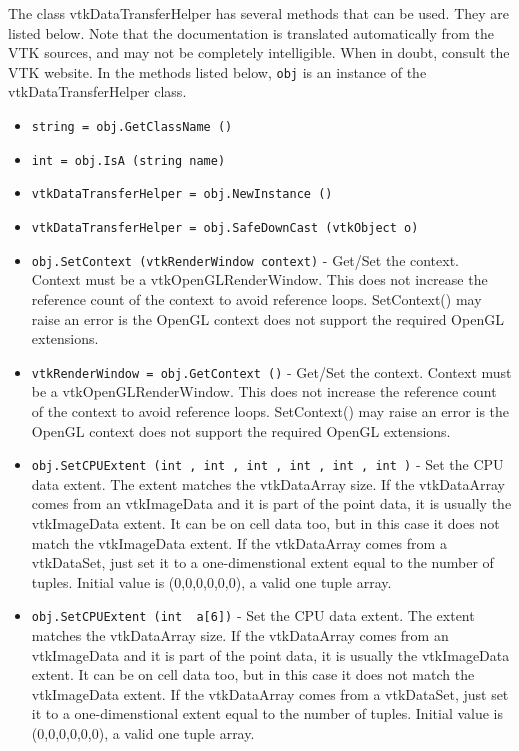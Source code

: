 The class vtkDataTransferHelper has several methods that can be used.
  They are listed below.
Note that the documentation is translated automatically from the VTK sources,
and may not be completely intelligible.  When in doubt, consult the VTK website.
In the methods listed below, \verb|obj| is an instance of the vtkDataTransferHelper class.
\begin{itemize}
\item  \verb|string = obj.GetClassName ()|

\item  \verb|int = obj.IsA (string name)|

\item  \verb|vtkDataTransferHelper = obj.NewInstance ()|

\item  \verb|vtkDataTransferHelper = obj.SafeDownCast (vtkObject o)|

\item  \verb|obj.SetContext (vtkRenderWindow context)| -  Get/Set the context. Context must be a vtkOpenGLRenderWindow. 
 This does not increase the reference count of the 
 context to avoid reference loops.
 SetContext() may raise an error is the OpenGL context does not support the
 required OpenGL extensions.

\item  \verb|vtkRenderWindow = obj.GetContext ()| -  Get/Set the context. Context must be a vtkOpenGLRenderWindow. 
 This does not increase the reference count of the 
 context to avoid reference loops.
 SetContext() may raise an error is the OpenGL context does not support the
 required OpenGL extensions.

\item  \verb|obj.SetCPUExtent (int , int , int , int , int , int )| -  Set the CPU data extent. The extent matches the vtkDataArray size.
 If the vtkDataArray comes from an vtkImageData and it is part of the
 point data, it is usually the vtkImageData extent.
 It can be on cell data too, but in this case it does not match the
 vtkImageData extent.
 If the vtkDataArray comes from a vtkDataSet, just
 set it to a one-dimenstional extent equal to the number of tuples.
 Initial value is (0,0,0,0,0,0), a valid one tuple array.

\item  \verb|obj.SetCPUExtent (int  a[6])| -  Set the CPU data extent. The extent matches the vtkDataArray size.
 If the vtkDataArray comes from an vtkImageData and it is part of the
 point data, it is usually the vtkImageData extent.
 It can be on cell data too, but in this case it does not match the
 vtkImageData extent.
 If the vtkDataArray comes from a vtkDataSet, just
 set it to a one-dimenstional extent equal to the number of tuples.
 Initial value is (0,0,0,0,0,0), a valid one tuple array.


\end{itemize}
